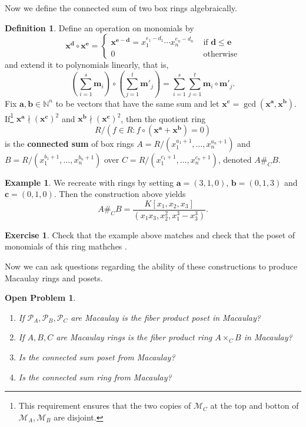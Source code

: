 \documentclass[11pt]{amsart}
\newcommand{\N}{{\mathbb N}}
\newcommand{\ba}{{\mathbf a}}
\newcommand{\bb}{{\mathbf b}}
\newcommand{\bc}{{\mathbf c}}
\newcommand{\be}{{\mathbf e}}
\newcommand{\bx}{{\mathbf x}}
\newcommand{\M}{{\mathcal M}}
\renewcommand{\P}{{\mathcal P}}
\def\bm{\mathbf{m}}
\theoremstyle{plain} %
\newtheorem{oprobl}{Open Problem}
\theoremstyle{definition}
\newtheorem{defn}[thm]{Definition}
\newtheorem{ex}[thm]{Example}
\newtheorem{exer}[thm]{Exercise}
\theoremstyle{remark}
\numberwithin{equation}{section}  %
\begin{document}
Now we define the connected sum of two box rings algebraically.
\begin{tcolorbox}
\begin{defn}\label{def: connected sum rings}
Define an operation on monomials by 
\[
\bx^{\mathbf{d}} \circ \bx^\be= \begin{cases}
\bx^{\be-\mathbf{d}}=x_1^{e_1-d_1}\cdots x_n^{e_n-d_n} & \text{ if } \mathbf{d}\leq \be\\
0 & \text{ otherwise}
\end{cases}
\]
and extend it to polynomials linearly, that is, 
\[
(\sum_{i=1}^s \bm_i)\circ (\sum_{j=1}^t \bm'_j)=\sum_{i=1}^s\sum_{j=1}^t  \bm_i\circ \bm'_j.
\]
Fix $\ba, \bb\in \N^n$ to be vectors that have the same sum and let $\bx^\bc=\gcd(\bx^\ba, \bx^\bb)$. If\footnote[2]{This requirement ensures that the two copies of $\M_C$ at the top and botton of $\M_A, \M_B$ are disjoint.} $\bx^\ba \nmid (\bx^\bc)^2$ and $\bx^\bb \nmid (\bx^\bc)^2$, then the quotient ring
 \[
 R/(f\in R : f\circ(\bx^\ba+\bx^\bb)=0)
 \]
 is the {\bf connected sum} of  box rings $A=R/(x_1^{a_1+1},\ldots, x_n^{a_n+1})$ and $B=R/(x_1^{b_1+1},\ldots, x_n^{b_n+1})$ over  $C=R/(x_1^{c_1+1},\ldots, x_n^{c_n+1})$, denoted $A\#_C B$.
 \end{defn} 
\end{tcolorbox}

\begin{ex}
We recreate  with rings by setting $\ba=(3,1,0)$, $\bb=(0,1,3)$ and $\bc=(0,1,0)$. Then the construction above yields 
 \[
 A\#_C B=\frac{K[x_1,x_2,x_3]}{(x_1x_3, x_2^2, x_1^3-x_3^3)}.
 \]
\end{ex}

\begin{tcolorbox}[reset]
\begin{exer}
Check that the example above matches  and check that the poset of monomials of this ring mathches .
\end{exer}
\end{tcolorbox}

Now we can ask questions regarding the ability of these constructions to produce Macaulay rings and posets.

\begin{tcolorbox}[reset]
\begin{oprobl}\label{oprobl 4}
\begin{enumerate}
\item If $\P_A, \P_B,\P_C$ are Macaulay is the fiber product poset in  Macaulay?
\item If $A, B, C$ are Macaulay rings is the fiber product ring $A\times_C B$  in  Macaulay?
\item  Is the connected sum poset from  Macaulay?
\item Is the connected sum ring from  Macaulay? 
\end{enumerate}
\end{oprobl}
\end{tcolorbox}
\end{document}
